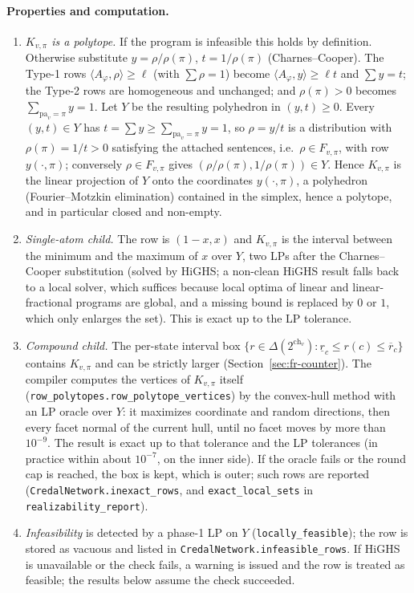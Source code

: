 \documentclass{article} %
\newcommand{\lo}{\underline}
\newcommand{\hi}{\overline}
\newcommand{\ch}{\mathrm{ch}}
\newcommand{\pa}{\mathrm{pa}}
\begin{document}
\paragraph{Properties and computation.}
\begin{enumerate}
\item \emph{$K_{v,\pi}$ is a polytope.} If the program is infeasible this holds by definition. Otherwise
  substitute $y=\rho/\rho(\pi)$, $t=1/\rho(\pi)$ (Charnes--Cooper). The Type-1 rows
  $\langle A_\varphi,\rho\rangle\ge\ell$ (with $\sum\rho=1$) become $\langle A_\varphi,y\rangle\ge\ell t$
  and $\sum y=t$; the Type-2 rows are homogeneous and unchanged; and $\rho(\pi)>0$ becomes
  $\sum_{\pa_v=\pi}y=1$. Let $Y$ be the resulting polyhedron in $(y,t)\ge0$. Every $(y,t)\in Y$ has
  $t=\sum y\ge\sum_{\pa_v=\pi}y=1$, so $\rho=y/t$ is a distribution with $\rho(\pi)=1/t>0$ satisfying
  the attached sentences, i.e.\ $\rho\in F_{v,\pi}$, with row $y(\cdot,\pi)$; conversely
  $\rho\in F_{v,\pi}$ gives $(\rho/\rho(\pi),1/\rho(\pi))\in Y$. Hence $K_{v,\pi}$ is the linear
  projection of $Y$ onto the coordinates $y(\cdot,\pi)$, a polyhedron (Fourier--Motzkin elimination) contained in
  the simplex, hence a polytope, and in particular closed and non-empty.
\item \emph{Single-atom child.} The row is $(1-x,x)$ and $K_{v,\pi}$ is the interval between the
  minimum and the maximum of $x$ over $Y$, two LPs after the Charnes--Cooper substitution (solved by HiGHS; a non-clean HiGHS result
  falls back to a local solver, which suffices because local optima of linear and linear-fractional
  programs are global, and a missing bound is replaced by $0$ or $1$, which only enlarges the set). This is
  exact up to the LP tolerance.
\item \emph{Compound child.} The per-state interval box
  $\{r\in\Delta(2^{\ch_v}):\lo r_c\le r(c)\le\hi r_c\}$ contains $K_{v,\pi}$ and can be strictly larger
  (Section~\ref{sec:fr-counter}). The compiler computes the vertices of $K_{v,\pi}$ itself
  (\texttt{row\_polytopes.row\_polytope\_vertices}) by the convex-hull method with an LP oracle over
  $Y$: it maximizes coordinate and random directions, then every facet normal of the current hull,
  until no facet moves by more than $10^{-9}$. The result is exact up to that tolerance and the LP
  tolerances (in practice within about $10^{-7}$, on the inner side). If the oracle fails or the round
  cap is reached, the box is kept, which is outer; such rows are reported
  (\texttt{CredalNetwork.inexact\_rows}, and \texttt{exact\_local\_sets} in
  \texttt{realizability\_report}).
\item \emph{Infeasibility} is detected by a phase-1 LP on $Y$ (\texttt{locally\_feasible}); the row is
  stored as vacuous and listed in \texttt{CredalNetwork.infeasible\_rows}. If HiGHS is unavailable or
  the check fails, a warning is issued and the row is treated as feasible; the results below assume
  the check succeeded.
\end{enumerate}
\end{document}
